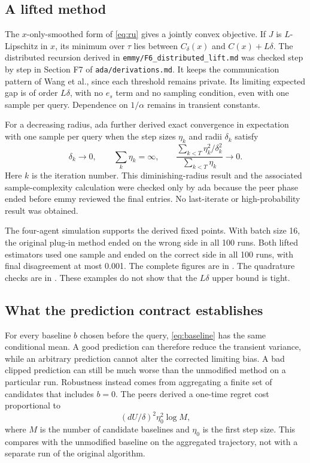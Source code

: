 \documentclass{article}
\begin{document}
\subsection{A lifted method}

The $x$-only-smoothed form of \eqref{eq:ru} gives a jointly convex objective. If $J$ is $L$-Lipschitz in $x$, its minimum over $\tau$ lies between $C_\delta(x)$ and $C(x)+L\delta$. The distributed recursion derived in \texttt{emmy/F6\_distributed\_lift.md} was checked step by step in Section F7 of \texttt{ada/derivations.md}. It keeps the communication pattern of Wang et al., since each threshold remains private. Its limiting expected gap is of order $L\delta$, with no $e_s$ term and no sampling condition, even with one sample per query. Dependence on $1/\alpha$ remains in transient constants.

For a decreasing radius, ada further derived exact convergence in expectation with one sample per query when the step sizes $\eta_k$ and radii $\delta_k$ satisfy
\begin{equation}
 \delta_k\longrightarrow0,\qquad
 \sum_k\eta_k=\infty,\qquad
 \frac{\sum_{k<T}\eta_k^2/\delta_k^2}{\sum_{k<T}\eta_k}\longrightarrow0.
 \label{eq:diminishing}
\end{equation}
Here $k$ is the iteration number. This diminishing-radius result and the associated sample-complexity calculation were checked only by ada because the peer phase ended before emmy reviewed the final entries. No last-iterate or high-probability result was obtained.

The four-agent simulation supports the derived fixed points. With batch size 16, the original plug-in method ended on the wrong side in all 100 runs. Both lifted estimators used one sample and ended on the correct side in all 100 runs, with final disagreement at most 0.001. The complete figures are in . The quadrature checks are in . These examples do not show that the $L\delta$ upper bound is tight.

\subsection{What the prediction contract establishes}

For every baseline $b$ chosen before the query, \eqref{eq:baseline} has the same conditional mean. A good prediction can therefore reduce the transient variance, while an arbitrary prediction cannot alter the corrected limiting bias. A bad clipped prediction can still be much worse than the unmodified method on a particular run. Robustness instead comes from aggregating a finite set of candidates that includes $b=0$. The peers derived a one-time regret cost proportional to
\begin{equation}
 (dU/\delta)^2\eta_0^2\log M,
\end{equation}
where $M$ is the number of candidate baselines and $\eta_0$ is the first step size. This compares with the unmodified baseline on the aggregated trajectory, not with a separate run of the original algorithm.
\end{document}
